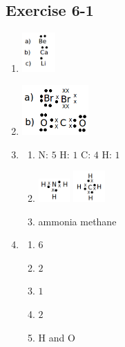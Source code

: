 \subsection{Exercise 6-1} 
\begin{multicols}{3}
\begin{enumerate}[noitemsep, label=\textbf{\arabic*}.]
\item %
\includegraphics[width=0.1\textwidth]{photos/bonding_lewis_diagram.png}
\item %
\includegraphics[width=0.2\textwidth]{photos/bonding_lewis_diagram1.png}
\item %
\begin{enumerate}[noitemsep, label=\textbf{(\alph*)} ]
\item $\text{N: } 5$ $\text{H: } 1$ $\text{C: } 4$ $\text{H: } 1$
\item \includegraphics[width=0.1\textwidth]{photos/bonding_lewis_diagram2.png} \includegraphics[width=0.1\textwidth]{photos/bonding_lewis_diagram3.png}
\item ammonia methane
\end{enumerate}
\item %
\begin{enumerate}[noitemsep, label=\textbf{(\alph*)} ]
\item $6$
\item $2$
\item $1$
\item $2$
\item H and O
\end{enumerate}
    \end{enumerate}
\end{multicols}
